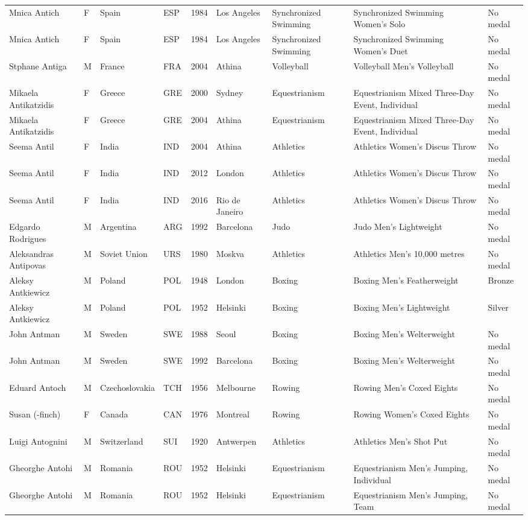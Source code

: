 \documentclass{article}%
\begin{document}
\begin{longtable}{l l l l l l l l l}
Mnica Antich&F&Spain&ESP&1984&Los Angeles&Synchronized Swimming&Synchronized Swimming Women's Solo&No medal\\%
Mnica Antich&F&Spain&ESP&1984&Los Angeles&Synchronized Swimming&Synchronized Swimming Women's Duet&No medal\\%
Stphane Antiga&M&France&FRA&2004&Athina&Volleyball&Volleyball Men's Volleyball&No medal\\%
Mikaela Antikatzidis&F&Greece&GRE&2000&Sydney&Equestrianism&Equestrianism Mixed Three{-}Day Event, Individual&No medal\\%
Mikaela Antikatzidis&F&Greece&GRE&2004&Athina&Equestrianism&Equestrianism Mixed Three{-}Day Event, Individual&No medal\\%
Seema Antil&F&India&IND&2004&Athina&Athletics&Athletics Women's Discus Throw&No medal\\%
Seema Antil&F&India&IND&2012&London&Athletics&Athletics Women's Discus Throw&No medal\\%
Seema Antil&F&India&IND&2016&Rio de Janeiro&Athletics&Athletics Women's Discus Throw&No medal\\%
Edgardo Rodrigues&M&Argentina&ARG&1992&Barcelona&Judo&Judo Men's Lightweight&No medal\\%
Aleksandras Antipovas&M&Soviet Union&URS&1980&Moskva&Athletics&Athletics Men's 10,000 metres&No medal\\%
Aleksy Antkiewicz&M&Poland&POL&1948&London&Boxing&Boxing Men's Featherweight&Bronze\\%
Aleksy Antkiewicz&M&Poland&POL&1952&Helsinki&Boxing&Boxing Men's Lightweight&Silver\\%
John Antman&M&Sweden&SWE&1988&Seoul&Boxing&Boxing Men's Welterweight&No medal\\%
John Antman&M&Sweden&SWE&1992&Barcelona&Boxing&Boxing Men's Welterweight&No medal\\%
Eduard Antoch&M&Czechoslovakia&TCH&1956&Melbourne&Rowing&Rowing Men's Coxed Eights&No medal\\%
Susan ({-}finch)&F&Canada&CAN&1976&Montreal&Rowing&Rowing Women's Coxed Eights&No medal\\%
Luigi Antognini&M&Switzerland&SUI&1920&Antwerpen&Athletics&Athletics Men's Shot Put&No medal\\%
Gheorghe Antohi&M&Romania&ROU&1952&Helsinki&Equestrianism&Equestrianism Men's Jumping, Individual&No medal\\%
Gheorghe Antohi&M&Romania&ROU&1952&Helsinki&Equestrianism&Equestrianism Men's Jumping, Team&No medal\\%

\end{longtable}
\end{document}
